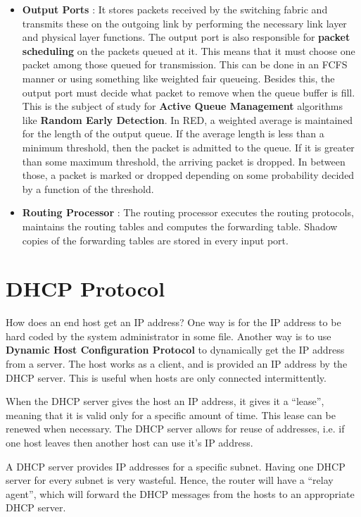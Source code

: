 \documentclass[12pt,letterpaper]{book}
\theoremstyle{definition}
\begin{document}
\begin{itemize}
  \item \textbf{Output Ports} : It stores packets received by the switching fabric and transmits these on the outgoing link by performing the necessary link layer and physical layer functions. The output port is also responsible for \textbf{packet scheduling} on the packets queued at it. This means that it must choose one packet among those queued for transmission. This can be done in an FCFS manner or using something like weighted fair queueing. Besides this, the output port must decide what packet to remove when the queue buffer is fill. This is the subject of study for \textbf{Active Queue Management} algorithms like \textbf{Random Early Detection}. In RED, a weighted average is maintained for the length of the output queue. If the average length is less than a minimum threshold, then the packet is admitted to the queue. If it is greater than some maximum threshold, the arriving packet is dropped. In between those, a packet is marked or dropped depending on some probability decided by a function of the threshold.
  \item \textbf{Routing Processor}  : The routing processor executes the routing protocols, maintains the routing tables and computes the forwarding table. Shadow copies of the forwarding tables are stored in every input port.
\end{itemize}


\section{DHCP Protocol}

How does an end host get an IP address? One way is for the IP address to be hard coded by the system administrator in some file. Another way is to use \textbf{Dynamic Host Configuration Protocol}  to dynamically get the IP address from a server. The host works as a client, and is provided an IP address by the DHCP server. This is useful when hosts are only connected intermittently.

When the DHCP server gives the host an IP address, it gives it a ``lease'', meaning that it is valid only for a specific amount of time. This lease can be renewed when necessary. The DHCP server allows for reuse of addresses, i.e. if one host leaves then another host can use it's IP address.

A DHCP server provides IP addresses for a specific subnet. Having one DHCP server for every subnet is very wasteful. Hence, the router will have a ``relay agent'', which will forward the DHCP messages from the hosts to an appropriate DHCP server.
\end{document}
